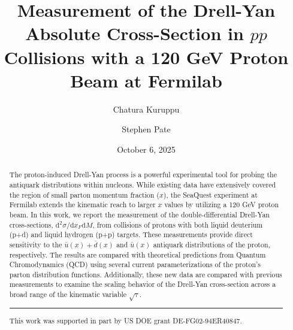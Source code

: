 \documentclass[11pt]{article}
\newcommand{\diffd}{\mathrm{d}}
\begin{document}
\linenumbers
\title{\textbf{Measurement of the Drell-Yan Absolute Cross-Section in $pp$ Collisions with a 120 GeV Proton Beam at Fermilab}}
\author[1]{Chatura Kuruppu}
\author[1]{Stephen Pate}
\date{October 6, 2025} %
\maketitle

\begin{abstract}
The proton-induced Drell-Yan process is a powerful experimental tool for probing the antiquark distributions within nucleons. While existing data have extensively covered the region of small parton momentum fraction ($x$), the SeaQuest experiment at Fermilab extends the kinematic reach to larger $x$ values by utilizing a 120 GeV proton beam. In this work, we report the measurement of the double-differential Drell-Yan cross-sections, $\diffd^{2}\sigma/\diffd x_{F}\diffd M$, from collisions of protons with both liquid deuterium (p+d) and liquid hydrogen (p+p) targets. These measurements provide direct sensitivity to the $\bar{u}(x) + \bar{d}(x)$ and $\bar{u}(x)$ antiquark distributions of the proton, respectively. The results are compared with theoretical predictions from Quantum Chromodynamics (QCD) using several current parameterizations of the proton's parton distribution functions. Additionally, these new data are compared with previous measurements to examine the scaling behavior of the Drell-Yan cross-section across a broad range of the kinematic variable $\sqrt{\tau}$.
\vspace{1em}
\hrule
\vspace{1em}
\footnotesize{This work was supported in part by US DOE grant DE-FG02-94ER40847.}
\end{abstract}

\clearpage

\tableofcontents
\clearpage
\listoffigures
\clearpage
\listoftables
\clearpage

\end{document}
